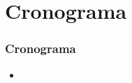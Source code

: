 \section{Cronograma}

\begin{frame}\frametitle{Cronograma} 
\begin{itemize}
	\item 
\end{itemize}	
\end{frame}